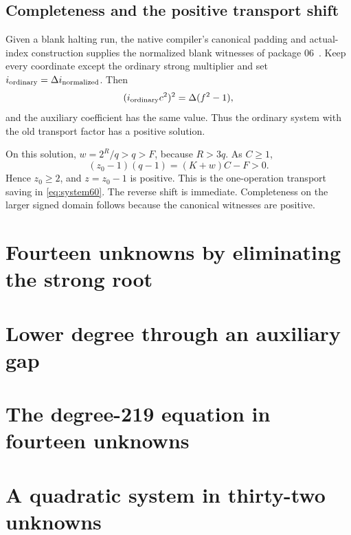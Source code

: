 \documentclass[11pt,a4paper]{article}
\theoremstyle{definition}\newtheorem{definition}[theorem]{Definition}
\theoremstyle{remark}\newtheorem{remark}[theorem]{Remark}
\begin{document}
\subsection{Completeness and the positive transport shift}

Given a blank halting run, the native compiler's canonical padding and
actual-index construction supplies the normalized blank witnesses of
package 06~\cite{blank06}. Keep every coordinate except the ordinary
strong multiplier and set \(i_{\rm ordinary}=\Delta i_{\rm normalized}\).
Then
\[
 (i_{\rm ordinary}c^2)^2
 =\Delta(f^2-1),
\]
and the auxiliary coefficient has the same value. Thus the ordinary
system with the old transport factor has a positive solution.

On this solution, \(w=2^R/q>q>F\), because \(R>3q\).
As \(C\ge1\),
\[
 (z_0-1)(q-1)=(K+w)C-F>0.
\]
Hence \(z_0\ge2\), and \(z=z_0-1\) is positive. This is the
one-operation transport saving in \eqref{eq:system60}. The reverse
shift is immediate. Completeness on the larger signed domain follows
because the canonical witnesses are positive.

\section{Fourteen unknowns by eliminating the strong root}
\label{sec:fourteen}


\section{Lower degree through an auxiliary gap}
\label{sec:gap15}


\section{The degree-219 equation in fourteen unknowns}
\label{sec:gap14}


\section{A quadratic system in thirty-two unknowns}
\label{sec:quartic}
\end{document}
